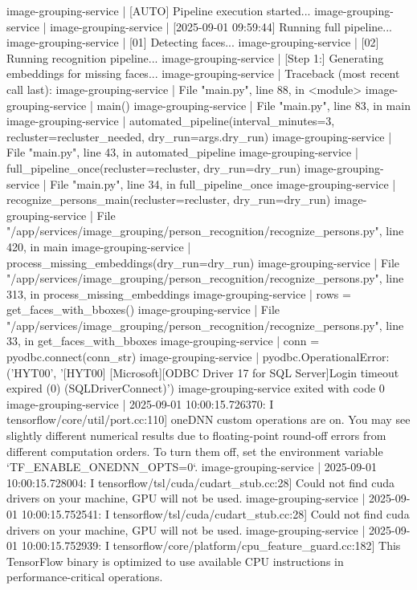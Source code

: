 image-grouping-service  | [AUTO] Pipeline execution started...
image-grouping-service  |
image-grouping-service  | [2025-09-01 09:59:44] Running full pipeline...
image-grouping-service  | [01] Detecting faces...
image-grouping-service  | [02] Running recognition pipeline...
image-grouping-service  | [Step 1:] Generating embeddings for missing faces...
image-grouping-service  | Traceback (most recent call last):
image-grouping-service  |   File "main.py", line 88, in <module>
image-grouping-service  |     main()
image-grouping-service  |   File "main.py", line 83, in main
image-grouping-service  |     automated_pipeline(interval_minutes=3, recluster=recluster_needed, dry_run=args.dry_run)
image-grouping-service  |   File "main.py", line 43, in automated_pipeline
image-grouping-service  |     full_pipeline_once(recluster=recluster, dry_run=dry_run)
image-grouping-service  |   File "main.py", line 34, in full_pipeline_once
image-grouping-service  |     recognize_persons_main(recluster=recluster, dry_run=dry_run)
image-grouping-service  |   File "/app/services/image_grouping/person_recognition/recognize_persons.py", line 420, in main
image-grouping-service  |     process_missing_embeddings(dry_run=dry_run)
image-grouping-service  |   File "/app/services/image_grouping/person_recognition/recognize_persons.py", line 313, in process_missing_embeddings
image-grouping-service  |     rows = get_faces_with_bboxes()
image-grouping-service  |   File "/app/services/image_grouping/person_recognition/recognize_persons.py", line 33, in get_faces_with_bboxes
image-grouping-service  |     conn = pyodbc.connect(conn_str)
image-grouping-service  | pyodbc.OperationalError: ('HYT00', '[HYT00] [Microsoft][ODBC Driver 17 for SQL Server]Login timeout expired (0) (SQLDriverConnect)')
image-grouping-service exited with code 0
image-grouping-service  | 2025-09-01 10:00:15.726370: I tensorflow/core/util/port.cc:110] oneDNN custom operations are on. You may see slightly different numerical results due to floating-point round-off errors from different computation orders. To turn them off, set the environment variable `TF_ENABLE_ONEDNN_OPTS=0`.
image-grouping-service  | 2025-09-01 10:00:15.728004: I tensorflow/tsl/cuda/cudart_stub.cc:28] Could not find cuda drivers on your machine, GPU will not be used.
image-grouping-service  | 2025-09-01 10:00:15.752541: I tensorflow/tsl/cuda/cudart_stub.cc:28] Could not find cuda drivers on your machine, GPU will not be used.
image-grouping-service  | 2025-09-01 10:00:15.752939: I tensorflow/core/platform/cpu_feature_guard.cc:182] This TensorFlow binary is optimized to use available CPU instructions in performance-critical operations.
